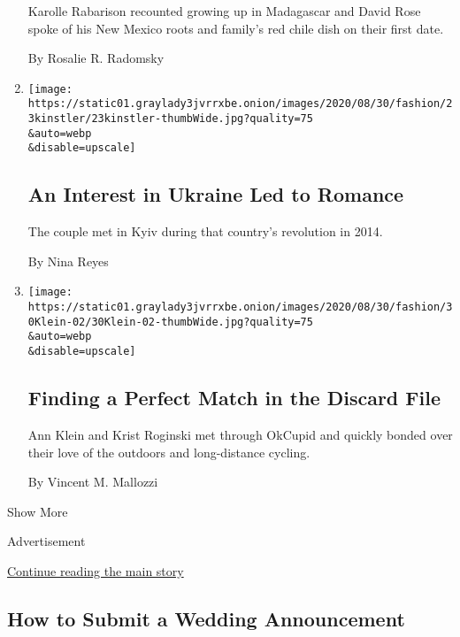 \begin{enumerate}
  Karolle Rabarison recounted growing up in Madagascar and David Rose
  spoke of his New Mexico roots and family's red chile dish on their
  first date.

  By Rosalie R. Radomsky
\item
  \href{/2020/08/28/fashion/weddings/an-interest-in-ukraine-led-to-romance.html}{}

  \texttt{[image: https://static01.graylady3jvrrxbe.onion/images/2020/08/30/fashion/23kinstler/23kinstler-thumbWide.jpg?quality=75\\\&auto=webp\\\&disable=upscale]}

  \hypertarget{an-interest-in-ukraine-led-to-romance}{%
  \subsection{An Interest in Ukraine Led to
  Romance}\label{an-interest-in-ukraine-led-to-romance}}

  The couple met in Kyiv during that country's revolution in 2014.

  By Nina Reyes
\item
  \href{/2020/08/28/fashion/weddings/finding-a-perfect-match-in-the-discard-file.html}{}

  \texttt{[image: https://static01.graylady3jvrrxbe.onion/images/2020/08/30/fashion/30Klein-02/30Klein-02-thumbWide.jpg?quality=75\\\&auto=webp\\\&disable=upscale]}

  \hypertarget{finding-a-perfect-match-in-the-discard-file}{%
  \subsection{Finding a Perfect Match in the Discard
  File}\label{finding-a-perfect-match-in-the-discard-file}}

  Ann Klein and Krist Roginski met through OkCupid and quickly bonded
  over their love of the outdoors and long-distance cycling.

  By Vincent M. Mallozzi
\end{enumerate}

Show More

Advertisement

\protect\hyperlink{after-mid5}{Continue reading the main story}

\hypertarget{how-to-submit-a-wedding-announcement}{%
\subsection{How to Submit a Wedding
Announcement}\label{how-to-submit-a-wedding-announcement}}

